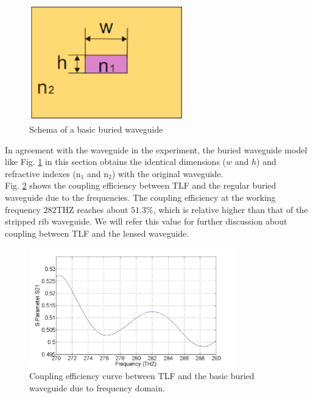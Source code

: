 \begin{figure}[!ht]
\centering
\includegraphics[width=0.6\textwidth]{bilder/buried_waveguide}
\caption{Schema of a basic buried waveguide}
\label{fig:buried_waveguide}
\end{figure}
In agreement with the waveguide in the experiment, the buried waveguide model like Fig. \ref{fig:buried_waveguide} in this section obtains the identical dimensions ($w$ and $h$) and refractive indexes (n$_{1}$ and n$_{2}$) with the original waveguide.\\ 
Fig. \ref{fig:curve_coupling_basic_buried_waveguide} shows the coupling efficiency between TLF and the regular buried waveguide due to the frequencies. The coupling efficiency at the working frequency $282$THZ reaches about $51.3\%$, which is relative higher than that of the stripped rib waveguide. We will refer this value for further discussion about coupling between TLF and the lensed waveguide.  
\begin{figure}[!ht]
\centering
\includegraphics[width=0.8\textwidth]{bilder/s21_sym_waveguide}
\caption{Coupling efficiency curve between TLF and the basic buried waveguide due to frequency domain.}
\label{fig:curve_coupling_basic_buried_waveguide}
\end{figure}
